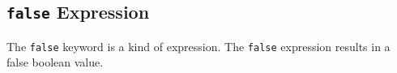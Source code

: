 
\subsection{\texttt{false} Expression}
{
	The \lstinline[language=MAIA, columns=fixed]@false@ keyword is a kind of expression.
	The \texttt{false} expression results in a false boolean value.
}

